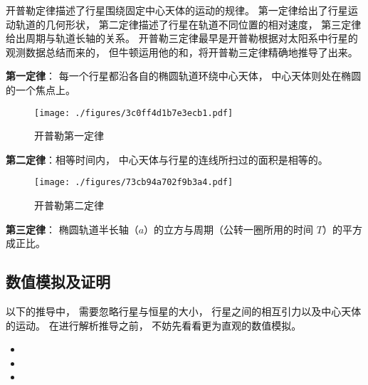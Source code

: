 

开普勒定律描述了行星围绕固定中心天体的运动的规律。 第一定律给出了行星运动轨道的几何形状， 第二定律描述了行星在轨道不同位置的相对速度， 第三定律给出周期与轨道长轴的关系。 开普勒三定律最早是开普勒根据对太阳系中行星的观测数据总结而来的， 但牛顿运用他的和，将开普勒三定律精确地推导了出来。

\textbf{第一定律}： 每一个行星都沿各自的椭圆轨道环绕中心天体， 中心天体则处在椭圆的一个焦点上。
\begin{figure}[ht]
\centering
\texttt{[image: ./figures/3c0ff4d1b7e3ecb1.pdf]}
\caption{开普勒第一定律} \label{fig_Keple_1}
\end{figure}

\textbf{第二定律}：相等时间内， 中心天体与行星的连线所扫过的面积是相等的。
\begin{figure}[ht]
\centering
\texttt{[image: ./figures/73cb94a702f9b3a4.pdf]}
\caption{开普勒第二定律} \label{fig_Keple_2}
\end{figure}

\textbf{第三定律}： 椭圆轨道半长轴（$a$）的立方与周期（公转一圈所用的时间 $T$）的平方成正比。

\subsection{数值模拟及证明}

以下的推导中， 需要忽略行星与恒星的大小， 行星之间的相互引力以及中心天体的运动。 在进行解析推导之前， 不妨先看看更为直观的数值模拟。
 
\begin{itemize}
\item {}
\item {}
\item {}
\end{itemize}
 
